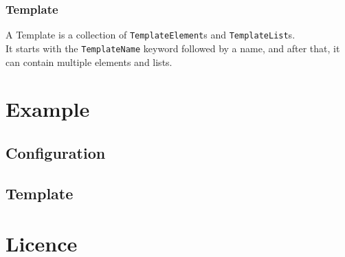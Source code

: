 \documentclass[12pt]{article}
\begin{document}
    \subsubsection{Template}
    A Template is a collection of \texttt{TemplateElement}s and \texttt{TemplateList}s. \\
    It starts with the \texttt{TemplateName} keyword followed by a name, and after that, it can contain multiple elements and lists.

    \newpage

    \section{Example}
    \begin{minipage}[t]{0.5\textwidth}
        \subsection{Configuration}
        
    \end{minipage}
    \begin{minipage}[t]{0.5\textwidth}
        \subsection{Template}
        
    \end{minipage}

    \newpage

    \section{Licence}
    \doclicenseThis
\end{document}
